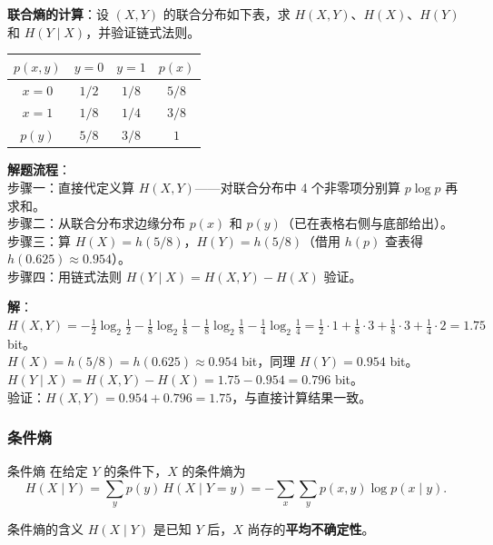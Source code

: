 \begin{example}
\label{ex:ch2-joint-entropy}
\textbf{联合熵的计算}：设 $(X,Y)$ 的联合分布如下表，求 $H(X,Y)$、$H(X)$、$H(Y)$ 和 $H(Y\mid X)$，并验证链式法则。

\begin{center}
\begin{tabular}{c|cc|c}
\toprule
$p(x,y)$ & $y=0$ & $y=1$ & $p(x)$ \\
\midrule
$x=0$ & $1/2$ & $1/8$ & $5/8$ \\
$x=1$ & $1/8$ & $1/4$ & $3/8$ \\
\midrule
$p(y)$ & $5/8$ & $3/8$ & $1$ \\
\bottomrule
\end{tabular}
\end{center}

\noindent \textbf{解题流程}：\\[2pt]
步骤一：直接代定义算 $H(X,Y)$——对联合分布中 4 个非零项分别算 $p\log p$ 再求和。\\
步骤二：从联合分布求边缘分布 $p(x)$ 和 $p(y)$（已在表格右侧与底部给出）。\\
步骤三：算 $H(X)=h(5/8)$，$H(Y)=h(5/8)$（借用 $h(p)$ 查表得 $h(0.625)\approx0.954$）。\\
步骤四：用链式法则 $H(Y\mid X)=H(X,Y)-H(X)$ 验证。

\textbf{解}：\\[2pt]
$H(X,Y)=-\frac{1}{2}\log_2\frac{1}{2}-\frac{1}{8}\log_2\frac{1}{8}-\frac{1}{8}\log_2\frac{1}{8}-\frac{1}{4}\log_2\frac{1}{4}
        =\frac{1}{2}\cdot1+\frac{1}{8}\cdot3+\frac{1}{8}\cdot3+\frac{1}{4}\cdot2=1.75$ bit。\\[2pt]
$H(X)=h(5/8)=h(0.625)\approx0.954$ bit，同理 $H(Y)=0.954$ bit。\\[2pt]
$H(Y\mid X)=H(X,Y)-H(X)=1.75-0.954=0.796$ bit。\\[2pt]
验证：$H(X,Y)=0.954+0.796=1.75$，与直接计算结果一致。
\end{example}

\subsubsection{条件熵}
\begin{definitionBox}{条件熵}
在给定 $Y$ 的条件下，$X$ 的条件熵为
\[
H(X \mid Y) = \sum_{y} p(y)\, H(X \mid Y=y)
            = -\sum_{x}\sum_{y} p(x,y) \log p(x \mid y).
\]
\end{definitionBox}

\begin{keypoint}{条件熵的含义}
$H(X \mid Y)$ 是已知 $Y$ 后，$X$ 尚存的\textbf{平均不确定性}。
\end{keypoint}

